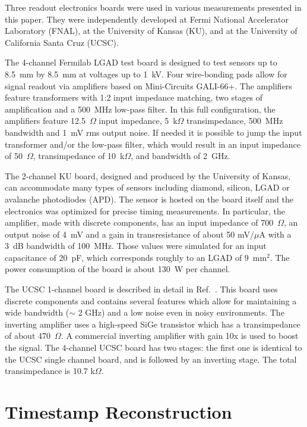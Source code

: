 \documentclass[preprint,1p]{elsarticle}
\begin{document}
Three readout electronics boards were used in various measurements presented in this paper.
They were independently developed at Fermi National Accelerator Laboratory (FNAL),
at the University of Kansas (KU), and at the University of California Santa Cruz (UCSC).

The 4-channel Fermilab LGAD test board is designed to test sensors up to 8.5~mm
by 8.5~mm at voltages up to 1~kV. Four wire-bonding pads allow for signal
readout via amplifiers based on Mini-Circuits GALI-66+. The amplifiers feature 
transformers with 1:2 input impedance matching, two stages of amplification and 
a 500~MHz low-pass filter. In this full configuration, the amplifiers feature
12.5~$\Omega$ input impedance, 5~k$\Omega$ transimpedance, 500~MHz bandwidth and
1~mV rms output noise. If needed it is possible to jump the input transformer 
and/or the low-pass filter, which would result in an input impedance of 50~$\Omega$,
transimpedance of 10~k$\Omega$, and bandwidth of 2~GHz.

The 2-channel KU board, designed and produced by the University of Kansas, can
accommodate many types of sensors including diamond, silicon, LGAD or avalanche photodiodes (APD). 
The sensor is hosted on the board itself and the electronics was optimized for precise 
timing measurements. In particular, the amplifier, made with discrete components, 
has an input impedance of 700~$\Omega$, an output noise of 4~mV and a gain in 
transresistance of about 50 mV/$\mu$A with a 3~dB bandwidth of 100~MHz. 
Those values were simulated for an input capacitance of 20~pF, 
which corresponds roughly to an LGAD of $9$~$\mathrm{mm}^{2}$. The power
consumption of the board is about 130~W per channel. 

The UCSC 1-channel board is described in detail in
Ref.~\cite{Cartiglia201783}. This board uses discrete components and contains
several features which allow for maintaining a wide bandwidth ($\sim$ 2 GHz) and a
low noise even in noisy environments. The inverting amplifier uses a high-speed
SiGe transistor which has a transimpedance of about 470~$\Omega$. A commercial
inverting amplifier with gain 10x is used to boost the signal. The 4-channel
UCSC board has two stages: the first one is identical to the UCSC single channel
board, and is followed by an inverting stage. The total transimpedance is 10.7
k$\Omega$.


\section{Timestamp Reconstruction}
\label{sec:timestampReco}
\end{document}
